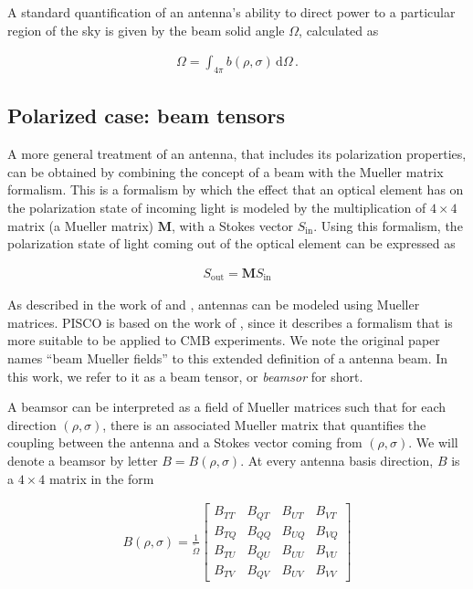 \documentclass[a4paper,11pt]{article}
\begin{document}
\noindent
A standard quantification of an antenna's ability to direct power to a particular region of the sky is given by the beam solid angle $\Omega$, calculated as

\begin{equation}
\begin{aligned}
\Omega = \int_{4\pi} b(\rho,\sigma) \, \mathrm{d} \Omega \, .
\end{aligned}
\label{eq::omega_def}
\end{equation}

\subsection{Polarized case: beam tensors}

A more general treatment of an antenna, that includes its polarization properties, can be obtained by combining the concept of a beam with the Mueller matrix formalism. This is a formalism by which the effect that an optical element has on the polarization state of incoming light is modeled by the multiplication of $4\times4$ matrix (a Mueller matrix) $\mathbf{M}$, with a Stokes vector $S_{\mathrm{in}}$. Using this formalism, the polarization state of light coming out of the optical element can be expressed as

\begin{equation}
\begin{aligned}
S_{\mathrm{out}} = \mathbf{M} S_{\mathrm{in}}
\end{aligned}
\end{equation}

As described in the work of \cite{piepmeier_long_njoku_2008} and \cite{2007MNRAS.376.1767O}, antennas can be modeled using Mueller matrices. PISCO is based on the work of \cite{2007MNRAS.376.1767O}, since it describes a formalism that is more suitable to be applied to CMB experiments. We note the original paper names ``beam Mueller fields'' to this extended definition of a antenna beam. In this work, we refer to it as a beam tensor, or \textsl{beamsor} for short.

A beamsor can be interpreted as a field of Mueller matrices such that for each direction $(\rho,\sigma)$, there is an associated Mueller matrix that quantifies the coupling between the antenna and a Stokes vector coming from $(\rho,\sigma)$. We will denote a beamsor by letter $B = B(\rho,\sigma)$. At every antenna basis direction, $B$ is a $4\times4$ matrix in the form

\begin{equation}
\begin{aligned}
B(\rho,\sigma) = \frac{1}{\tilde{\Omega}}
\begin{bmatrix}
B_{TT} & B_{QT} & B_{UT} & B_{VT}\\
B_{TQ} & B_{QQ} & B_{UQ} & B_{VQ}\\
B_{TU} & B_{QU} & B_{UU} & B_{VU}\\
B_{TV} & B_{QV} & B_{UV} & B_{VV}
\end{bmatrix}
\end{aligned}
\label{eq::beamsor}
\end{equation}
\end{document}
